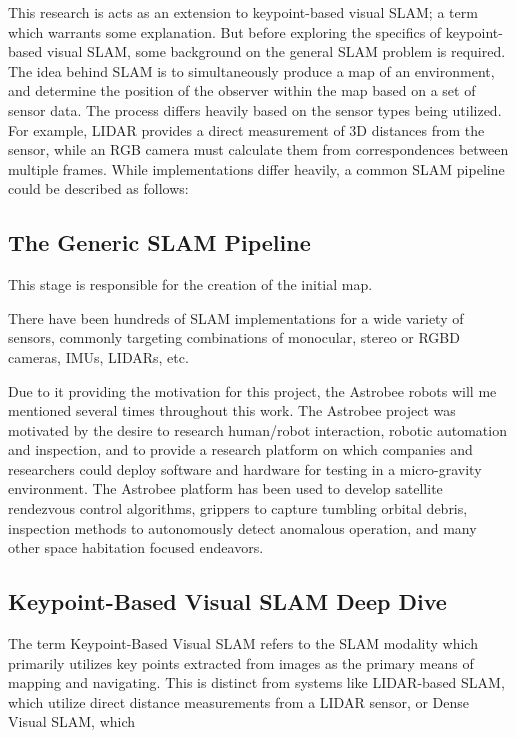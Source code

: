 \documentclass[12pt]{article}
\begin{document}
This research is acts as an extension to keypoint-based visual SLAM; a term which warrants some explanation. But before exploring the specifics of keypoint-based visual SLAM, some background on the general SLAM problem is required. The idea behind SLAM is to simultaneously produce a map of an environment, and determine the position of the observer within the map based on a set of sensor data. The process differs heavily based on the sensor types being utilized. For example, LIDAR provides a direct measurement of 3D distances from the sensor, while an RGB camera must calculate them from correspondences between multiple frames. While implementations differ heavily, a common SLAM pipeline could be described as follows:

\subsection{The Generic SLAM Pipeline}

This stage is responsible for the creation of the initial map.

There have been hundreds of SLAM implementations for a wide variety of sensors, commonly targeting combinations of monocular, stereo or RGBD cameras, IMUs, LIDARs, etc.

Due to it providing the motivation for this project, the Astrobee robots will me mentioned several times throughout this work. The Astrobee project was motivated by the desire to research human/robot interaction, robotic automation and inspection, and to provide a research platform on which companies and researchers could deploy software and hardware for testing in a micro-gravity environment. The Astrobee platform has been used to develop satellite rendezvous control algorithms, grippers to capture tumbling orbital debris, inspection methods to autonomously detect anomalous operation, and many other space habitation focused endeavors.

\subsection{Keypoint-Based Visual SLAM Deep Dive}

The term Keypoint-Based Visual SLAM refers to the SLAM modality which primarily utilizes key points extracted from images as the primary means of mapping and navigating. This is distinct from systems like LIDAR-based SLAM, which utilize direct distance measurements from a LIDAR sensor, or Dense Visual SLAM, which
\end{document}
